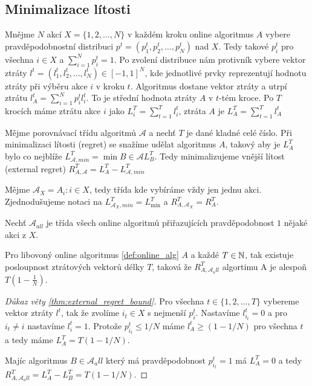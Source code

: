 \subsection{Minimalizace lítosti}
\begin{definition} 
\label{def:online_alg}
Mnějme $N$ akcí $X =\{1,2,\dots,N\}$ v každém kroku online algoritmus $A$ vybere pravděpodobnostní distribuci $p^t=(p_1^t, p_2^t, \dots, p_N^t)$ nad $X$. 
Tedy takové $p_i^t$ pro všechna $i \in X$ a $\sum^N_{i=1} p_i^t = 1$. 
Po zvolení distribuce nám protivník vybere vektor ztráty $l^t =(l^t_1, l^t_2, \dots, l^t_N) \in [-1,1]^N$, kde jednotlivé prvky reprezentují hodnotu ztráty při výběru akce $i$ v kroku $t$. 
Algoritmus dostane vektor ztráty a utrpí ztrátu $l^t_A = \sum^N_{i=1} p_i^t l_i^t$. 
To je střední hodnota ztráty $A$ v $t$-tém kroce. 
Po $T$ krocích máme ztrátu akce $i$ jako $L_i^T = \sum^T_{t=1} l_i^t$, ztráta $A$ je $L_A^T = \sum^T_{t=1} l^t_A$
\end{definition}

\begin{definition}
\label{def:external_regret}
Mějme porovnávací třídu algoritmů $\mathcal{A}$ a nechť $T$ je dané kladné celé číslo. 
Při minimalizaci lítosti (regret) se snažíme udělat algoritmus $A$, takový aby je $L^T_A$ bylo co nejblíže $L_{\mathcal{A},min}^T = \min{B \in \mathcal{A}} L^T_B$. 
Tedy minimalizujeme vnější lítost (external regret) $R^T_{A,\mathcal{A}} = L^T_A - L^T_{\mathcal{A},min}$

Mějme $\mathcal{A}_X = {A_i: i\in X}$, tedy třída kde vybíráme vždy jen jednu akci. 
Zjednodušujeme notaci na $L^T_{\mathcal{A}_X,min} = L^T_{\min}$ a $R^T_{A,\mathcal{A}_X} = R^T_A$.

Nechť $\mathcal{A}_{all}$ je třída všech online algoritmů přiřazujících pravděpodobnost $1$ nějaké akci z $X$. 
\end{definition}

\begin{theorem}
\label{thm:external_regret_bound}
Pro libovoný online algoritmus \ref{def:online_alg} $A$ a každé $T \in \mathbb{N}$, tak existuje posloupnost ztrátových vektorů délky $T$, taková že $R^T_{A,\mathcal{A}_all}$ algortimu A je alespoň $T(1 - \frac{1}{N})$. 
\end{theorem}
\begin{proof}[Důkaz věty \ref{thm:external_regret_bound}]
Pro všechna $t\in\{1,2,\dots,T\}$ vybereme vektor ztráty $l^t$, tak že zvolíme $i_t \in X$ s nejmenší $p_i^t$. 
Nastavíme $l^t_{i_t} = 0$ a pro $i_t \neq i$ nastavíme $l_i^t = 1$. 
Protože $p^t_{i_t} \leq 1/N$ máme $l^t_A \geq (1 - 1/N)$ pro všechna $t$ a tedy máme $L_A^T = T(1-1/N)$. 

Majíc algoritmus $B\in \mathcal{A}_all$ který má pravděpodobnost $p_{i_t}^t = 1$ má $L_A^T = 0$ a tedy $R^T_{A,\mathcal{A}_all} = L^T_A - L^T_B = T(1-1/N)$.
\end{proof}

